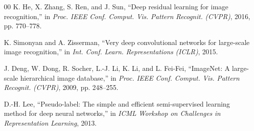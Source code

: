 \documentclass[conference]{IEEEtran}
\begin{document}
\begin{thebibliography}{00}
K. He, X. Zhang, S. Ren, and J. Sun, ``Deep residual learning for image
recognition,'' in \emph{Proc. IEEE Conf. Comput. Vis. Pattern
Recognit. (CVPR)}, 2016, pp. 770--778.

K. Simonyan and A. Zisserman, ``Very deep convolutional networks for
large-scale image recognition,'' in \emph{Int. Conf. Learn.
Representations (ICLR)}, 2015.

J. Deng, W. Dong, R. Socher, L.-J. Li, K. Li, and L. Fei-Fei,
``ImageNet: A large-scale hierarchical image database,'' in \emph{Proc.
IEEE Conf. Comput. Vis. Pattern Recognit. (CVPR)}, 2009, pp. 248--255.

D.-H. Lee, ``Pseudo-label: The simple and efficient semi-supervised
learning method for deep neural networks,'' in \emph{ICML Workshop on
Challenges in Representation Learning}, 2013.

%
%
%
%
%
%

\end{thebibliography}
\end{document}
